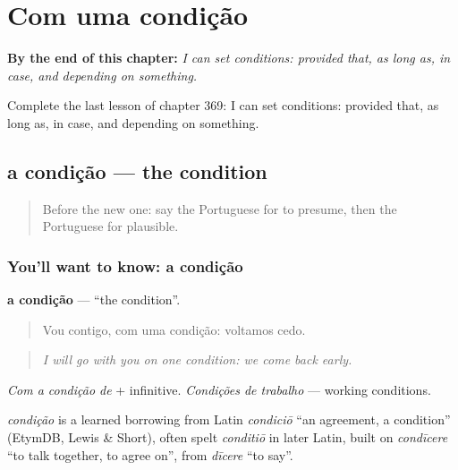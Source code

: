 
\chapter{Com uma condição}
\label{ch:pt-com-uma-condicao}

\begin{chapteropening}
\textbf{By the end of this chapter:} \emph{I can set conditions: provided that, as long as, in case, and depending on something.}

Complete the last lesson of chapter 369: I can set conditions: provided that, as long as, in case, and depending on something.
\end{chapteropening}

\section[a condição]{a condição — the condition}

\label{lesson:PT-C369-condicao}



\begin{quote}
Before the new one: say the Portuguese for to presume, then the Portuguese for plausible.
\end{quote}

\subsection*{You'll want to know: a condição}
\textbf{a condição} — \textquotedblleft{}the condition\textquotedblright{}.

\begin{quote}
Vou contigo, com uma condição: voltamos cedo.
\end{quote}

\begin{quote}
\emph{I will go with you on one condition: we come back early.}
\end{quote}

\emph{Com a condição de} + infinitive. \emph{Condições de trabalho} — working conditions.

\begin{cousinweb}
\emph{condição} is a learned borrowing from Latin \emph{condiciō} \textquotedblleft{}an agreement, a condition\textquotedblright{} (EtymDB, Lewis \& Short), often spelt \emph{conditiō} in later Latin, built on \emph{condīcere} \textquotedblleft{}to talk together, to agree on\textquotedblright{}, from \emph{dīcere} \textquotedblleft{}to say\textquotedblright{}.
\end{cousinweb}

